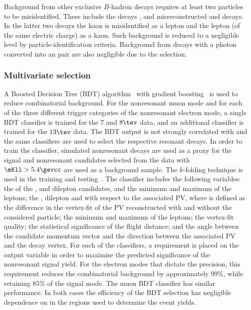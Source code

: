 Background from other exclusive $B$-hadron decays requires at least two particles to be misidentified. These include the decays \BuKpipi, and misreconstructed \BuJpsiKll and \BuPsiKll decays. In the latter two decays the kaon is misidentified as a lepton and the lepton (of the same electric charge) as a kaon. Such background is reduced to a negligible level by particle-identification criteria. Background from decays with a photon converted into an \epem pair are also negligible due to the \qsq selection.


\subsubsection*{Multivariate selection}

A Boosted Decision Tree (BDT)  algorithm~\cite{Breiman} with gradient boosting~\cite{GradBoost} is used to reduce combinatorial background. For the nonresonant muon mode and for each of the three different trigger categories of the 
nonresonant electron mode, a single BDT classifier is trained for the 7 and $8\tev$ data, and an additional classifier is trained for the $13\tev$ data. The BDT output is not strongly correlated with \qsq and the same classifiers are used to select the respective resonant decays. 
In order to train the classifier, simulated nonresonant \BuKll decays are used as a proxy for the signal and nonresonant \Kll candidates selected from the data with $\mKll > 5.4\gevcc$ are used as a background sample. The $k$-folding technique is used in the training and testing~\cite{Blum:1999:BHB:307400.307439}. 
The classifier includes the following variables:  the  \pt of the \Bp, \Kp and dilepton candidates, and the minimum and maximum \pt of the leptons;  the \Bp, dilepton and \Kp \chisqip with respect to the associated PV, where \chisqip is defined as the difference in the vertex-fit \chisq of the PV reconstructed with and without the considered particle; the minimum and maximum \chisqip of the leptons; the \Bp vertex-fit quality; the statistical significance of the \Bp flight distance; and the angle between the \Bp candidate momentum vector and the direction between the associated PV and the \Bp decay vertex. 
For each of the classifiers, a requirement is placed on the output variable in order to maximise the predicted significance of the nonresonant signal yield. For the electron modes that dictate the \RK precision, this requirement reduces the combinatorial background by approximately $99\%$, while retaining $85\%$ of the signal mode. The muon BDT classifier has similar performance. In both cases the efficiency of the BDT selection has negligible dependence on \mKll in the regions used to determine the event yields. 

